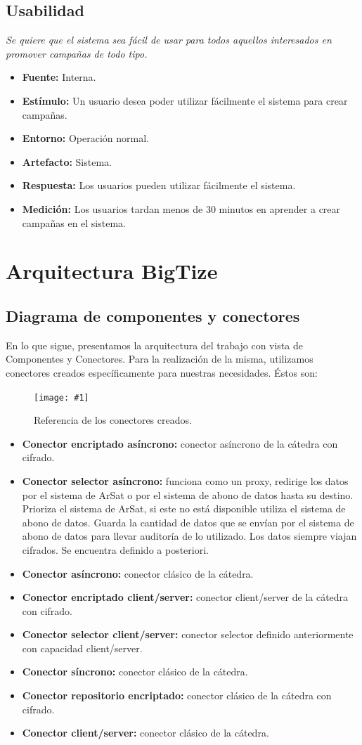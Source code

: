 \documentclass[a4paper, 10pt, twoside]{article}
\newcommand{\diagrama}[1]{
  \begin{center}
    \texttt{[image: \#1]}
  \end{center}
}
\newcommand{\escenario}[7] {
  \textit{{#1}}
  \begin{itemize}
    \item \textbf{Fuente:} {#2}
    \item \textbf{Estímulo:} {#3}
    \item \textbf{Entorno:} {#4}
    \item \textbf{Artefacto:} {#5}
    \item \textbf{Respuesta:} {#6}
    \item \textbf{Medición:} {#7}
  \end{itemize}
}
\begin{document}
\subsection{Usabilidad}

\escenario{Se quiere que el sistema sea fácil de usar para todos aquellos interesados en promover campañas de todo tipo.}
    {Interna.}
    {Un usuario desea poder utilizar fácilmente el sistema para crear campañas.}
    {Operación normal.}
    {Sistema.}
    {Los usuarios pueden utilizar fácilmente el sistema.}
    {Los usuarios tardan menos de 30 minutos en aprender a crear campañas en el sistema.}

\newpage

\section{Arquitectura BigTize}

\subsection{Diagrama de componentes y conectores}
En lo que sigue, presentamos la arquitectura del trabajo con vista de Componentes y Conectores. Para la realización de la misma, utilizamos conectores creados específicamente para nuestras necesidades. Éstos son:

\begin{figure}[h!]
\centering
  \diagrama{./diagramas/referenciadeconectores.pdf}
  \caption{Referencia de los conectores creados.}
\end{figure}

\begin{itemize}
  \item \textbf{Conector encriptado asíncrono:} conector asíncrono de la cátedra con cifrado.
  \item \textbf{Conector selector asíncrono:} funciona como un proxy, redirige los datos por el sistema de ArSat o por el sistema de abono de datos hasta su destino. Prioriza el sistema de ArSat, si este no está disponible utiliza el sistema de abono de datos. Guarda la cantidad de datos que se envían por el sistema de abono de datos para llevar auditoría de lo utilizado. Los datos siempre viajan cifrados. Se encuentra definido a posteriori.
  \item \textbf{Conector asíncrono:} conector clásico de la cátedra.
  \item \textbf{Conector encriptado client/server:} conector client/server de la cátedra con cifrado.
  \item \textbf{Conector selector client/server:} conector selector definido anteriormente con capacidad client/server.
  \item \textbf{Conector síncrono:} conector clásico de la cátedra.
  \item \textbf{Conector repositorio encriptado:} conector clásico de la cátedra con cifrado.
  \item \textbf{Conector client/server:} conector clásico de la cátedra.

\end{itemize}
\end{document}
